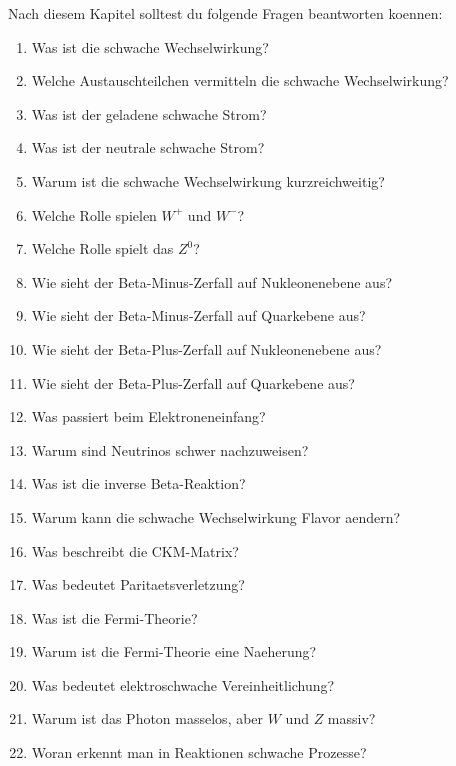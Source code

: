 \begin{examtipbox}
Nach diesem Kapitel solltest du folgende Fragen beantworten koennen:
\begin{enumerate}
    \item Was ist die schwache Wechselwirkung?
    \item Welche Austauschteilchen vermitteln die schwache Wechselwirkung?
    \item Was ist der geladene schwache Strom?
    \item Was ist der neutrale schwache Strom?
    \item Warum ist die schwache Wechselwirkung kurzreichweitig?
    \item Welche Rolle spielen $W^+$ und $W^-$?
    \item Welche Rolle spielt das $Z^0$?
    \item Wie sieht der Beta-Minus-Zerfall auf Nukleonenebene aus?
    \item Wie sieht der Beta-Minus-Zerfall auf Quarkebene aus?
    \item Wie sieht der Beta-Plus-Zerfall auf Nukleonenebene aus?
    \item Wie sieht der Beta-Plus-Zerfall auf Quarkebene aus?
    \item Was passiert beim Elektroneneinfang?
    \item Warum sind Neutrinos schwer nachzuweisen?
    \item Was ist die inverse Beta-Reaktion?
    \item Warum kann die schwache Wechselwirkung Flavor aendern?
    \item Was beschreibt die CKM-Matrix?
    \item Was bedeutet Paritaetsverletzung?
    \item Was ist die Fermi-Theorie?
    \item Warum ist die Fermi-Theorie eine Naeherung?
    \item Was bedeutet elektroschwache Vereinheitlichung?
    \item Warum ist das Photon masselos, aber $W$ und $Z$ massiv?
    \item Woran erkennt man in Reaktionen schwache Prozesse?
\end{enumerate}
\end{examtipbox}